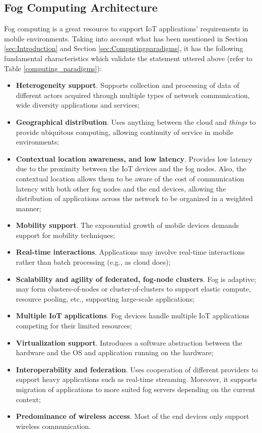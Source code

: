 \subsection{Fog Computing Architecture}
\label{sec:fog_architecture}
Fog computing is a great resource to support IoT applications' requirements in mobile environments. Taking into account what has been mentioned in Section \ref{sec:Introduction} and Section \ref{sec:Computingparadigms}, it has the following fundamental characteristics which validate the statement uttered above (refer to Table \ref{computing_paradigms}):
\begin{itemize}
	\item \textbf{Heterogeneity support}. Supports collection and processing of data of different actors acquired through multiple types of network communication, wide diversity applications and services;
	\item \textbf{Geographical distribution}. Uses anything between the cloud and \textit{things} to provide ubiquitous computing, allowing continuity of service in mobile environments;
	\item \textbf{Contextual location awareness, and low latency}. Provides low latency due to the proximity between the IoT devices and the fog nodes. Also, the contextual location allows them to be aware of the cost of communication latency with both other fog nodes and the end devices, allowing the distribution of applications across the network to be organized in a weighted manner;
	\item \textbf{Mobility support}. The exponential growth of mobile devices demands support for mobility techniques;
	\item \textbf{Real-time interactions}. Applications may involve real-time interactions rather than batch processing (e.g., as cloud does);
	\item \textbf{Scalability and agility of federated, fog-node clusters}. Fog is adaptive; may form clusters-of-nodes or cluster-of-clusters to support elastic compute, resource pooling, etc., supporting large-scale applications;
	\item \textbf{Multiple IoT applications}. Fog devices handle multiple IoT applications competing for their limited resources;
	\item \textbf{Virtualization support}. Introduces a software abstraction between the hardware and the OS and application running on the hardware;
	\item \textbf{Interoperability and federation}. Uses cooperation of different providers to support heavy applications such as real-time streaming. Moreover, it supports migration of applications to more suited fog servers depending on the current context;
	\item \textbf{Predominance of wireless access}. Most of the end devices only support wireless communication.
\end{itemize}

